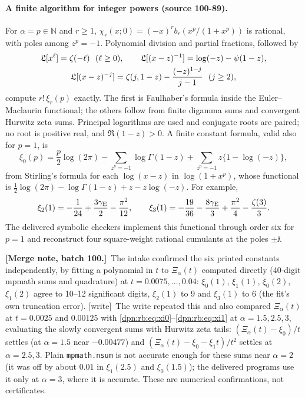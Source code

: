 \documentclass[11pt]{article}
\numberwithin{equation}{section}
\theoremstyle{definition}\newtheorem{definition}[theorem]{Definition}
\theoremstyle{remark}\newtheorem{remark}[theorem]{Remark}
\newcommand{\N}{\mathbb N}\newcommand{\R}{\mathbb R}\newcommand{\E}{\mathbb E}\newcommand{\Prob}{\mathbb P}
\newcommand{\src}[1]{\textup{(source #1)}}
\newcommand{\mergenoted}[1]{\par\smallskip\noindent\textbf{[Merge note, batch 100.]}\ #1\par\smallskip}
\newcommand{\wrt}{\textup{[write]}}
\begin{document}
\paragraph{A finite algorithm for integer powers \src{100-89}.}
For $\alpha=p\in\N$ and $r\ge1$, $\chi_r(x;0)=(-x)^rb_r(x^p/(1+x^p))$ is
rational, with poles among $z^p=-1$.  Polynomial division and partial
fractions, followed by
\begin{gather}
 \mathfrak L[x^\ell]=\zeta(-\ell)\ \ (\ell\ge0),\qquad
 \mathfrak L[(x-z)^{-1}]=\log(-z)-\psi(1-z),\notag\\
 \mathfrak L[(x-z)^{-j}]=\zeta(j,1-z)-\frac{(-z)^{1-j}}{j-1}\ \ (j\ge2),\label{dpn:rb:eq:rule}
\end{gather}
compute $r!\,\xi_r(p)$ exactly.  The first is Faulhaber's formula inside the
Euler--Maclaurin functional; the others follow from finite digamma sums and
convergent Hurwitz zeta sums.  Principal logarithms are used and conjugate
roots are paired; no root is positive real, and $\Re(1-z)>0$.  A finite
constant formula, valid also for $p=1$, is
\begin{equation}\label{dpn:rb:eq:gammaroot}
 \xi_0(p)=\frac p2\log(2\pi)-\sum_{z^p=-1}\log\Gamma(1-z)
                         +\sum_{z^p=-1}z\{1-\log(-z)\},
\end{equation}
from Stirling's formula for each $\log(x-z)$ in $\log(1+x^p)$, whose
functional is $\frac12\log(2\pi)-\log\Gamma(1-z)+z-z\log(-z)$.  For example,
\[
 \xi_2(1)=-\frac1{24}+\frac{3\gamma_{\rm E}}2-\frac{\pi^2}{12},\qquad
 \xi_3(1)=-\frac{19}{36}-\frac{8\gamma_{\rm E}}3+\frac{\pi^2}4-\frac{\zeta(3)}3.
\]
The delivered symbolic checkers implement this functional through order six
for $p=1$ and reconstruct four square-weight rational cumulants at the poles
$\pm\ii$.

\mergenoted{The intake confirmed the six printed constants independently, by
fitting a polynomial in $t$ to $\Xi_\alpha(t)$ computed directly (40-digit
mpmath sums and quadrature) at $t=0.0075,\dots,0.04$: $\xi_0(1)$, $\xi_1(1)$,
$\xi_0(2)$, $\xi_1(2)$ agree to 10--12 significant digits, $\xi_2(1)$ to 9 and
$\xi_3(1)$ to 6 (the fit's own truncation error).  \wrt\ The write repeated this and also
compared $\Xi_\alpha(t)$ at $t=0.0025$ and $0.00125$ with
\eqref{dpn:rb:eq:xi0}--\eqref{dpn:rb:eq:xi1} at $\alpha=1.5,2.5,3$, evaluating the
slowly convergent sums with Hurwitz zeta tails: $(\Xi_\alpha(t)-\xi_0)/t$
settles (at $\alpha=1.5$ near $-0.00477$) and $(\Xi_\alpha(t)-\xi_0-\xi_1t)/t^2$
settles at $\alpha=2.5,3$.  Plain \texttt{mpmath.nsum} is not accurate enough
for these sums near $\alpha=2$ (it was off by about $0.01$ in $\xi_1(2.5)$ and
$\xi_0(1.5)$); the delivered programs use it only at $\alpha=3$, where it is
accurate.  These are numerical confirmations, not certificates.}
\end{document}
